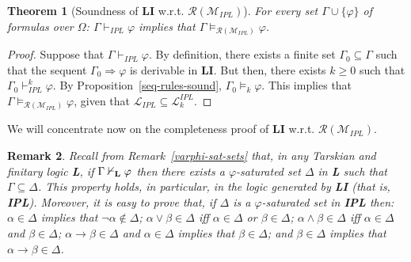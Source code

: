 \documentclass[12pt]{article}
\newtheorem{theorem}{Theorem}[section]
\newtheorem{proposition}[theorem]{Proposition}
\newtheorem{remark}[theorem]{Remark}
\newcommand{\bT}{\mathbf{T}}
\begin{document}



\begin{theorem} [Soundness  of {\bf LI}  w.r.t.  $\mathcal{R}(\mathcal{M}_{IPL})$] \label{thm:sound:IPL}
For every set $\Gamma \cup \{\varphi\}$ of formulas over $\Omega$: $\Gamma \vdash_{IPL} \varphi$ implies that $\Gamma  \models_{\mathcal{R}(\mathcal{M}_{IPL})} \varphi$.
\end{theorem}
\begin{proof}
Suppose that  $\Gamma \vdash_{IPL} \varphi$. By definition, there exists a finite set $\Gamma_0 \subseteq \Gamma$ such that the sequent $\Gamma_0 \Rightarrow \varphi$ is derivable in {\bf LI}. But then, there exists $k\geq 0$ such that $\Gamma_0 \vdash_{IPL}^k \varphi$. By Proposition~\ref{seq-rules-sound}, $\Gamma_0\models_k \varphi$. This implies that $\Gamma  \models_{\mathcal{R}(\mathcal{M}_{IPL})} \varphi$, given that $\mathcal{L}_{IPL} \subseteq \mathcal{L}_{k}^{IPL}$.
\end{proof}



We will concentrate now on the  completeness proof of {\bf LI} w.r.t. $\mathcal{R}(\mathcal{M}_{IPL})$.


\begin{remark} \label{rem:sat-IPL}
Recall from Remark~\ref{varphi-sat-sets} that, in any Tarskian and finitary logic {\bf L}, if $\Gamma \nvdash_{\bf L} \varphi$ then there exists a $\varphi$-saturated set $\Delta$ in {\bf L} such that $\Gamma \subseteq \Delta$. This property holds, in particular, in the logic generated by {\bf LI} (that is, \textbf{IPL}). Moreover, it is easy to prove that, if $\Delta$ is a $\varphi$-saturated set in \textbf{IPL} then: $\alpha \in \Delta$ implies that $\neg\alpha \notin \Delta$; $\alpha \vee \beta \in \Delta$ iff $\alpha \in \Delta$ or $\beta \in \Delta$; $\alpha \land \beta \in \Delta$ iff $\alpha \in \Delta$ and $\beta \in \Delta$;  $\alpha \to \beta \in \Delta$ and $\alpha \in \Delta$ implies that $\beta \in \Delta$; and $\beta \in \Delta$ implies that $\alpha \to \beta \in \Delta$.
\end{remark}
\end{document}
